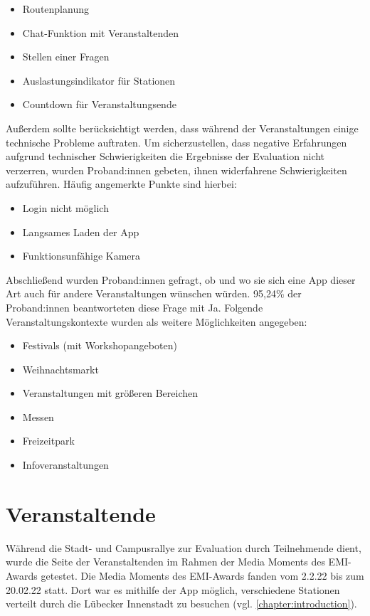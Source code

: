 \begin{itemize}[label=\bullet]
    \item Routenplanung
    \item Chat-Funktion mit Veranstaltenden
    \item Stellen einer Fragen
    \item Auslastungsindikator für Stationen
    \item Countdown für Veranstaltungsende
\end{itemize}

Außerdem sollte berücksichtigt werden, dass während der Veranstaltungen einige
technische Probleme auftraten. Um sicherzustellen, dass negative Erfahrungen
aufgrund technischer Schwierigkeiten die Ergebnisse der Evaluation nicht
verzerren, wurden Proband:innen gebeten, ihnen widerfahrene Schwierigkeiten
aufzuführen. Häufig angemerkte Punkte sind hierbei:

\begin{itemize}[label=\bullet]
    \item Login nicht möglich
    \item Langsames Laden der App
    \item Funktionsunfähige Kamera
\end{itemize}

Abschließend wurden Proband:innen gefragt, ob und wo sie sich eine App dieser
Art auch für andere Veranstaltungen wünschen würden. 95,24\% der Proband:innen
beantworteten diese Frage mit Ja. Folgende Veranstaltungskontexte
wurden als weitere Möglichkeiten angegeben:

\begin{itemize}[label=\bullet]
    \item Festivals (mit Workshopangeboten)
    \item Weihnachtsmarkt
    \item Veranstaltungen mit größeren Bereichen
    \item Messen
    \item Freizeitpark
    \item Infoveranstaltungen
\end{itemize}

\section{Veranstaltende}

Während die Stadt- und Campusrallye zur Evaluation durch Teilnehmende dient,
wurde die Seite der Veranstaltenden im Rahmen der Media Moments des EMI-Awards
getestet. Die Media Moments des EMI-Awards fanden vom 2.2.22 bis zum 20.02.22
statt. Dort war es mithilfe der App möglich, verschiedene Stationen verteilt
durch die Lübecker Innenstadt zu besuchen (vgl. \autoref{chapter:introduction}).

